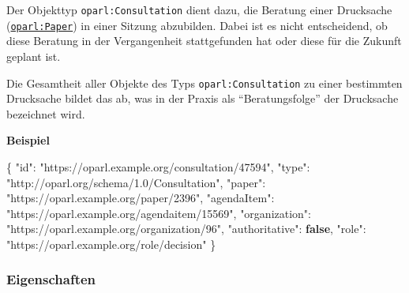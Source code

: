 \documentclass[,a4paper]{article}
\newenvironment{Shaded}{}{}
\newcommand{\KeywordTok}[1]{\textcolor[rgb]{0.00,0.44,0.13}{\textbf{{#1}}}}
\newcommand{\DataTypeTok}[1]{\textcolor[rgb]{0.56,0.13,0.00}{{#1}}}
\newcommand{\StringTok}[1]{\textcolor[rgb]{0.25,0.44,0.63}{{#1}}}
\newcommand{\FunctionTok}[1]{\textcolor[rgb]{0.02,0.16,0.49}{{#1}}}
\begin{document}
Der Objekttyp \texttt{oparl:Consultation} dient dazu, die Beratung einer
Drucksache (\hyperref[oparlux5fpaper]{\texttt{oparl:Paper}}) in einer
Sitzung abzubilden. Dabei ist es nicht entscheidend, ob diese Beratung
in der Vergangenheit stattgefunden hat oder diese für die Zukunft
geplant ist.

Die Gesamtheit aller Objekte des Typs \texttt{oparl:Consultation} zu
einer bestimmten Drucksache bildet das ab, was in der Praxis als
``Beratungsfolge'' der Drucksache bezeichnet wird.

\textbf{Beispiel}

\begin{Shaded}
\begin{Highlighting}[]
\FunctionTok{\{}
    \DataTypeTok{"id"}\FunctionTok{:} \StringTok{"https://oparl.example.org/consultation/47594"}\FunctionTok{,}
    \DataTypeTok{"type"}\FunctionTok{:} \StringTok{"http://oparl.org/schema/1.0/Consultation"}\FunctionTok{,}
    \DataTypeTok{"paper"}\FunctionTok{:} \StringTok{"https://oparl.example.org/paper/2396"}\FunctionTok{,}
    \DataTypeTok{"agendaItem"}\FunctionTok{:} \StringTok{"https://oparl.example.org/agendaitem/15569"}\FunctionTok{,}
    \DataTypeTok{"organization"}\FunctionTok{:} \StringTok{"https://oparl.example.org/organization/96"}\FunctionTok{,}
    \DataTypeTok{"authoritative"}\FunctionTok{:} \KeywordTok{false}\FunctionTok{,}
    \DataTypeTok{"role"}\FunctionTok{:} \StringTok{"https://oparl.example.org/role/decision"}
\FunctionTok{\}}
\end{Highlighting}
\end{Shaded}

\subsubsection{Eigenschaften}\label{eigenschaften-8}
\end{document}
